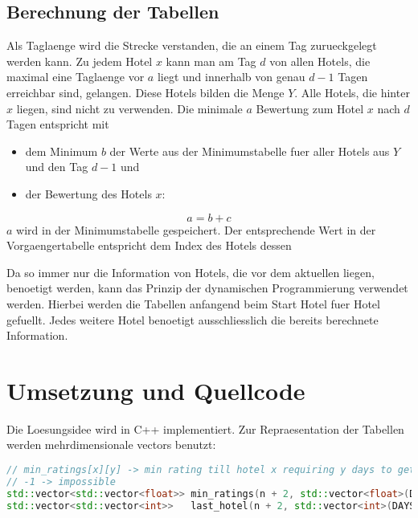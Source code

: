 \documentclass[a4paper,10pt,ngerman]{scrartcl}
\begin{document}
\subsection{Berechnung der Tabellen}
Als Taglaenge wird die Strecke verstanden, die an einem Tag zurueckgelegt werden kann.
Zu jedem Hotel $x$ kann man am Tag $d$ von allen Hotels, die maximal eine Taglaenge vor $a$ liegt und innerhalb von genau $d-1$ Tagen erreichbar sind, gelangen.
Diese Hotels bilden die Menge $Y$.
Alle Hotels, die hinter $x$ liegen, sind nicht zu verwenden.
Die minimale $a$ Bewertung zum Hotel $x$ nach $d$ Tagen entspricht mit
\begin{itemize}
    \item dem Minimum $b$ der Werte aus der Minimumstabelle fuer aller Hotels aus $Y$ und den Tag $d-1$ und
    \item der Bewertung des Hotels $x$:
\end{itemize}
\begin{equation*}
    a = b + c
\end{equation*}
$a$ wird in der Minimumstabelle gespeichert.
Der entsprechende Wert in der Vorgaengertabelle entspricht dem Index des Hotels dessen

Da so immer nur die Information von Hotels, die vor dem aktuellen liegen, benoetigt werden, kann das Prinzip der dynamischen Programmierung verwendet werden.
Hierbei werden die Tabellen anfangend beim \glqq{}Start\grqq{} Hotel fuer Hotel gefuellt.
Jedes weitere Hotel benoetigt ausschliesslich die bereits berechnete Information.

\section{Umsetzung und Quellcode}
Die Loesungsidee wird in C++ implementiert.
Zur Repraesentation der Tabellen werden mehrdimensionale vectors benutzt:
\begin{lstlisting}[language=C++]
// min_ratings[x][y] -> min rating till hotel x requiring y days to get to
// -1 -> impossible
std::vector<std::vector<float>> min_ratings(n + 2, std::vector<float>(DAYS + 1, -1));
std::vector<std::vector<int>>   last_hotel(n + 2, std::vector<int>(DAYS + 1, -1));
\end{lstlisting}
\end{document}
